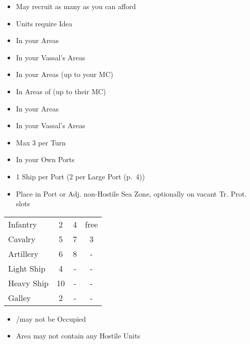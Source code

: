 \documentclass[10pt]{article}
\begin{document}
\begin{itemize}
	\item May recruit as many as you can afford
	\item {} Units require  Idea 
\end{itemize}
\begin{itemize}
	\item In your Areas
	\item In your Vassal's Areas
\end{itemize}
\begin{itemize}
	\item In your Areas (up to your MC)
	\item In Areas of \activeallies (up to their MC)
\end{itemize}
\begin{itemize}
	\item In your Areas
	\item In your Vassal's Areas
	\item Max 3 per Turn
\end{itemize}
\begin{itemize}
	\item In your Own Ports
	\item 1 Ship per Port (2 per Large Port (p.~4))
	\item Place in Port or Adj. non-Hostile Sea Zone, optionally on vacant Tr. Prot. slots
\end{itemize}
\begin{tabularx}{\columnwidth}{ | l | C | C | C | }
	\hline
	\null &  &  &  \\ \hline
	Infantry & 2\ducats & 4\ducats & free \\ \hline
	Cavalry & 5\ducats & 7\ducats & 3\ducats \\ \hline
	Artillery & 6\ducats & 8\ducats & - \\ \hline
	Light Ship & 4\ducats & - & - \\ \hline
	Heavy Ship & 10\ducats & - & - \\ \hline
	Galley & 2\ducats & - & - \\ \hline
\end{tabularx}

\begin{itemize}
	\item \town/\vassal may not be Occupied
	\item Area may not contain any Hostile Units
\end{itemize}
\end{document}
